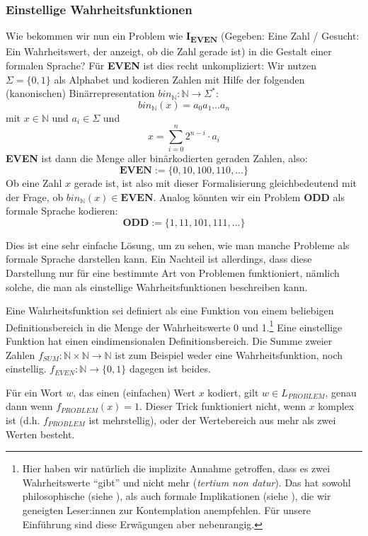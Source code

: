 \subsubsection{Einstellige Wahrheitsfunktionen}
Wie bekommen wir nun ein Problem wie \textbf{I\textsubscript{EVEN}}
(Gegeben: Eine Zahl / Gesucht: Ein Wahrheitswert, der anzeigt, ob die Zahl gerade ist)
in die Gestalt einer formalen Sprache?
Für \textbf{EVEN} ist dies recht unkompliziert:
Wir nutzen $\Sigma = \{0,1\}$ als Alphabet
und kodieren Zahlen mit Hilfe der folgenden (kanonischen) Binärrepresentation
$bin_{\mathbb{N}}: \mathbb{N} \rightarrow \Sigma^*$:
\[
    bin_{\mathbb{N}}(x) = a_{0}a_{1} \ldots a_{n}
\]
mit $x \in \mathbb{N}$ und $a_i \in \Sigma$ und
\[
    x = \sum_{i=0}^n 2^{n-i} \cdot a_i
\]
\textbf{EVEN} ist dann die Menge aller binärkodierten geraden Zahlen, also:
\[
    \mathbf{EVEN} := \{0, 10, 100, 110, \ldots\}
\]
Ob eine Zahl $x$ gerade ist, ist also mit dieser Formalisierung gleichbedeutend mit der Frage,
ob $bin_{\mathbb{N}}(x) \in \mathbf{EVEN}$.
Analog könnten wir ein Problem \textbf{ODD} als formale Sprache kodieren:
\[
    \mathbf{ODD} := \{1, 11, 101, 111, \ldots \}
\]

Dies ist eine sehr einfache Lösung, um zu sehen,
wie man manche Probleme als formale Sprache darstellen kann.
Ein Nachteil ist allerdings, dass diese Darstellung
nur für eine bestimmte Art von Problemen funktioniert,
nämlich solche, die man als einstellige Wahrheitsfunktionen beschreiben kann.


Eine Wahrheitsfunktion sei definiert als eine Funktion von einem beliebigen Definitionsbereich
in die Menge der Wahrheitswerte 0 und 1.\footnote{
    Hier haben wir natürlich die implizite Annahme getroffen,
    dass es zwei Wahrheitswerte ``gibt'' und nicht mehr (\emph{tertium non datur}).
    Das hat sowohl philosophische (siehe \cite{sep-logic-manyvalued}), als auch formale Implikationen (siehe \cite{gottwald}),
    die wir geneigten Leser:innen zur Kontemplation anempfehlen.
    Für unsere Einführung sind diese Erwägungen aber nebenrangig.
}
Eine einstellige Funktion hat einen eindimensionalen Definitionsbereich.
Die Summe zweier Zahlen $f_{SUM}: \mathbb{N} \times \mathbb{N} \rightarrow \mathbb{N}$
ist zum Beispiel weder eine Wahrheitsfunktion,
noch einstellig.
$f_{EVEN}: \mathbb{N} \rightarrow \{0,1\}$ dagegen ist beides.

Für ein Wort $w$, das einen (einfachen) Wert $x$ kodiert,
gilt $w \in L_{PROBLEM}$, genau dann wenn $f_{PROBLEM}(x) = 1$.
Dieser Trick funktioniert nicht,
wenn $x$ komplex ist (d.h. $f_{PROBLEM}$ ist mehrstellig),
oder der Wertebereich aus mehr als zwei Werten besteht.

